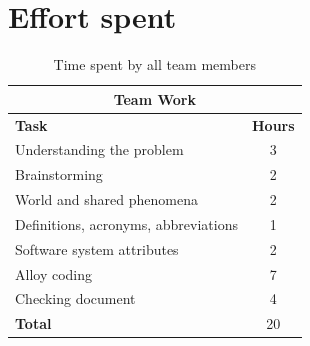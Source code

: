 \documentclass[a4paper, hidelinks, 12pt]{report}
\begin{document}
	\chapter{Effort spent}
	\begin{table}[h]
		\centering
		\begin{tabular}{l c}
			\hline\hline
			\multicolumn{2}{c}{\textbf{Team Work}} \\
			\hline
			\textbf{Task} & \textbf{Hours} \\ [0.5ex]
			\hline
			Understanding the problem & 3  \\
			Brainstorming & 2 \\
			World and shared phenomena & 2 \\
			Definitions, acronyms, abbreviations & 1  \\
			Software system attributes & 2 \\
			Alloy coding & 7 \\
			Checking document  & 4  \\
			\hline
			\textbf{Total} & 20  \\
			\hline
		\end{tabular}
		\caption{Time spent by all team members}
		\label{fig:Time spent by all team members}
	\end{table}
	
\end{document}
